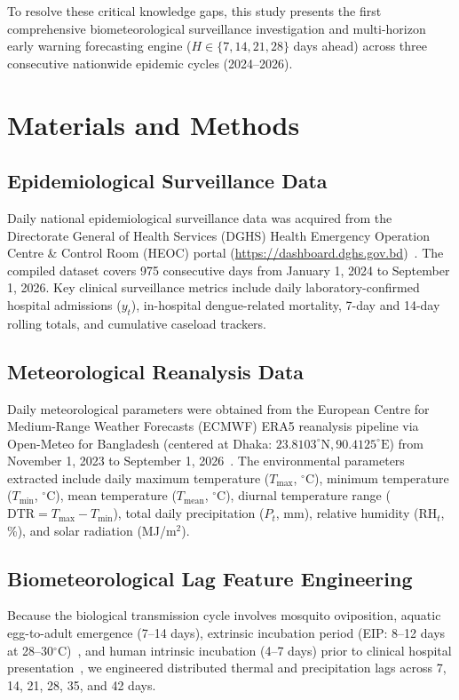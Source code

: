 \documentclass[11pt,a4paper]{article}
\begin{document}
To resolve these critical knowledge gaps, this study presents the first comprehensive biometeorological surveillance investigation and multi-horizon early warning forecasting engine ($H \in \{7, 14, 21, 28\}$ days ahead) across three consecutive nationwide epidemic cycles (2024--2026).

\section{Materials and Methods}

\subsection{Epidemiological Surveillance Data}
Daily national epidemiological surveillance data was acquired from the Directorate General of Health Services (DGHS) Health Emergency Operation Centre \& Control Room (HEOC) portal (\url{https://dashboard.dghs.gov.bd})~\cite{dghs2026dashboard}. The compiled dataset covers 975 consecutive days from January 1, 2024 to September 1, 2026. Key clinical surveillance metrics include daily laboratory-confirmed hospital admissions ($y_t$), in-hospital dengue-related mortality, 7-day and 14-day rolling totals, and cumulative caseload trackers.

\subsection{Meteorological Reanalysis Data}
Daily meteorological parameters were obtained from the European Centre for Medium-Range Weather Forecasts (ECMWF) ERA5 reanalysis pipeline via Open-Meteo for Bangladesh (centered at Dhaka: $23.8103^\circ\text{N}, 90.4125^\circ\text{E}$) from November 1, 2023 to September 1, 2026~\cite{hersbach2020era5}. The environmental parameters extracted include daily maximum temperature ($T_{\text{max}}$, $^\circ$C), minimum temperature ($T_{\text{min}}$, $^\circ$C), mean temperature ($T_{\text{mean}}$, $^\circ$C), diurnal temperature range ($\text{DTR} = T_{\text{max}} - T_{\text{min}}$), total daily precipitation ($P_t$, mm), relative humidity ($\text{RH}_t$, \%), and solar radiation (MJ/m$^2$).

\subsection{Biometeorological Lag Feature Engineering}
Because the biological transmission cycle involves mosquito oviposition, aquatic egg-to-adult emergence (7--14 days), extrinsic incubation period (EIP: 8--12 days at 28--30$^\circ$C)~\cite{watts1987effect,mordecai2019thermal,brady2014global}, and human intrinsic incubation (4--7 days) prior to clinical hospital presentation~\cite{carrington2013effects,colon2013effects}, we engineered distributed thermal and precipitation lags across 7, 14, 21, 28, 35, and 42 days.
\end{document}
